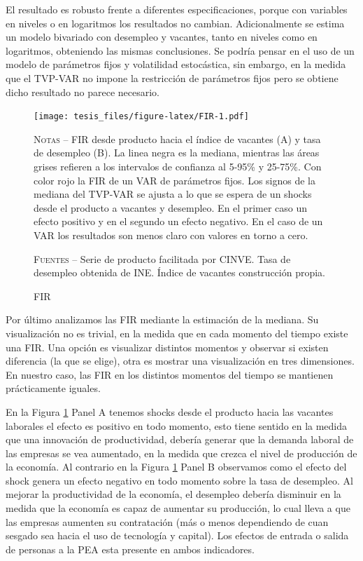 \documentclass[12pt,oneside]{reedthesis}
\begin{document}
El resultado es robusto frente a diferentes especificaciones, porque con variables en niveles o en logaritmos los resultados no cambian. Adicionalmente se estima un modelo bivariado con desempleo y vacantes, tanto en niveles como en logaritmos, obteniendo las mismas conclusiones. Se podría pensar en el uso de un modelo de parámetros fijos y volatilidad estocástica, sin embargo, en la medida que el TVP-VAR no impone la restricción de parámetros fijos pero se obtiene dicho resultado no parece necesario.
\begin{figure}
\texttt{[image: tesis\_files/figure-latex/FIR-1.pdf]}
\caption{FIR}\label{fig:FIR}\textsc{}

\footnotesize\textsc{Notas} -- FIR desde producto hacia el índice de vacantes (A) y tasa de desempleo (B). La linea negra es la mediana, mientras las áreas grises refieren a los intervalos de confianza al 5-95\% y 25-75\%. Con color rojo la FIR de un VAR de parámetros fijos. Los signos de la mediana del TVP-VAR se ajusta a lo que se espera de un shocks desde el producto a vacantes y desempleo. En el primer caso un efecto positivo y en el segundo un efecto negativo. En el caso de un VAR los resultados son menos claro con valores en torno a cero.

\textsc{Fuentes} -- Serie de producto facilitada por CINVE. Tasa de desempleo obtenida de INE. Índice de vacantes construcción propia.
\end{figure}
Por último analizamos las FIR mediante la estimación de la mediana. Su visualización no es trivial, en la medida que en cada momento del tiempo existe una FIR. Una opción es visualizar distintos momentos y observar si existen diferencia (la que se elige), otra es mostrar una visualización en tres dimensiones. En nuestro caso, las FIR en los distintos momentos del tiempo se mantienen prácticamente iguales.

En la Figura \ref{fig:FIR} Panel A tenemos shocks desde el producto hacia las vacantes laborales el efecto es positivo en todo momento, esto tiene sentido en la medida que una innovación de productividad, debería generar que la demanda laboral de las empresas se vea aumentado, en la medida que crezca el nivel de producción de la economía. Al contrario en la Figura \ref{fig:FIR} Panel B observamos como el efecto del shock genera un efecto negativo en todo momento sobre la tasa de desempleo. Al mejorar la productividad de la economía, el desempleo debería disminuir en la medida que la economía es capaz de aumentar su producción, lo cual lleva a que las empresas aumenten su contratación (más o menos dependiendo de cuan sesgado sea hacia el uso de tecnología y capital). Los efectos de entrada o salida de personas a la PEA esta presente en ambos indicadores.
\end{document}
